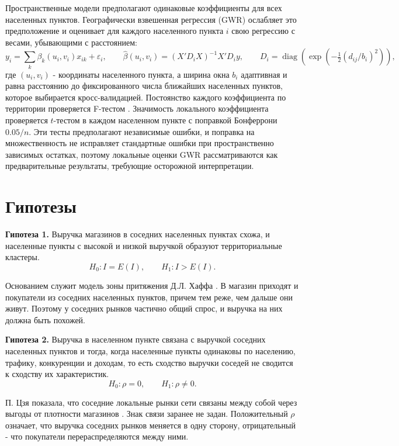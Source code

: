 \documentclass[12pt, a4paper]{article}
\begin{document}
Пространственные модели предполагают одинаковые коэффициенты для всех населенных пунктов. Географически
взвешенная регрессия (GWR) \cite{fotheringham2002} ослабляет это предположение и оценивает для
каждого населенного пункта $i$ свою регрессию с весами, убывающими с расстоянием:
\[
y_i = \sum_k \beta_k(u_i, v_i) x_{ik} + \varepsilon_i, \qquad
\hat{\beta}(u_i, v_i) = (X' D_i X)^{-1} X' D_i y, \qquad
D_i = \operatorname{diag}\left( \exp\left( -\tfrac{1}{2} (d_{ij} / b_i)^2 \right) \right),
\]
где $(u_i, v_i)$ - координаты населенного пункта, а ширина окна $b_i$ адаптивная и равна расстоянию до
фиксированного числа ближайших населенных пунктов, которое выбирается кросс-валидацией. Постоянство каждого
коэффициента по территории проверяется F-тестом \cite{leung2000}. Значимость локального
коэффициента проверяется $t$-тестом в каждом населенном пункте с поправкой Бонферрони $0.05 / n$. Эти тесты
предполагают независимые ошибки, и поправка на множественность не исправляет стандартные ошибки
при пространственно зависимых остатках, поэтому локальные оценки GWR рассматриваются как
предварительные результаты, требующие осторожной интерпретации.

\clearpage

\section*{Гипотезы}

\textbf{Гипотеза 1.} Выручка магазинов в соседних населенных пунктах схожа, и населенные пункты с
высокой и низкой выручкой образуют территориальные кластеры.
\[
H_0: I = E(I), \qquad H_1: I > E(I).
\]

Основанием служит модель зоны притяжения Д.Л. Хаффа \cite{huff1964}. В магазин приходят и
покупатели из соседних населенных пунктов, причем тем реже, чем дальше они живут. Поэтому у
соседних рынков частично общий спрос, и выручка на них должна быть похожей.

\textbf{Гипотеза 2.} Выручка в населенном пункте связана с выручкой соседних населенных пунктов и
тогда, когда населенные пункты одинаковы по населению, трафику, конкуренции и доходам, то есть
сходство выручки соседей не сводится к сходству их характеристик.
\[
H_0: \rho = 0, \qquad H_1: \rho \ne 0.
\]

П. Цзя показала, что соседние локальные рынки сети связаны между собой через выгоды от плотности
магазинов \cite{jia2008}. Знак связи заранее не задан. Положительный $\rho$ означает, что выручка
соседних рынков меняется в одну сторону, отрицательный - что покупатели перераспределяются между
ними.
\end{document}
